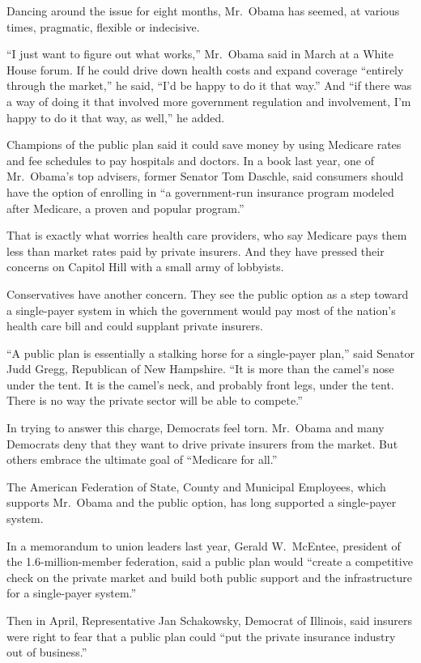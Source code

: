 ﻿\documentclass[12pt]{article}
\begin{document}
Dancing around the issue for eight months, Mr.~Obama has seemed, at various times,
pragmatic\cite{pragmatic}, flexible or indecisive.

``I just want to figure out what works,'' Mr.~Obama said in March at a White House forum. If he
could drive down health costs and expand coverage ``entirely through the market,'' he said, ``I'd be
happy to do it that way.'' And ``if there was a way of doing it that involved more government
regulation and involvement, I'm happy to do it that way, as well,'' he added.

Champions of the public plan said it could save money by using Medicare rates and fee schedules to
pay hospitals and doctors. In a book last year, one of Mr.~Obama's top advisers, former Senator Tom
Daschle, said consumers should have the option of enrolling in ``a government-run insurance program
modeled after Medicare, a proven and popular program.''

That is exactly what worries health care providers, who say Medicare pays them less than market
rates paid by private insurers. And they have pressed their concerns on Capitol Hill with a small
army of lobbyists.

Conservatives have another concern. They see the public option as a step toward a single-payer
system in which the government would pay most of the nation's health care bill and could supplant
private insurers.

``A public plan is essentially a stalking horse for a single-payer plan,'' said Senator Judd Gregg,
Republican of New Hampshire. ``It is more than the camel's nose under the tent. It is the camel's
neck, and probably front legs, under the tent. There is no way the private sector will be able to
compete.''

In trying to answer this charge, Democrats feel torn. Mr.~Obama and many Democrats deny that they
want to drive private insurers from the market. But others embrace the ultimate goal of ``Medicare
for all.''

The American Federation of State, County and Municipal Employees, which supports Mr.~Obama and the
public option, has long supported a single-payer system.

In a memorandum to union leaders last year, Gerald W.~McEntee, president of the 1.6-million-member
federation, said a public plan would ``create a competitive check on the private market and build
both public support and the infrastructure for a single-payer system.''

Then in April, Representative Jan Schakowsky, Democrat of Illinois, said insurers were right to fear
that a public plan could ``put the private insurance industry out of business.''
\end{document}
